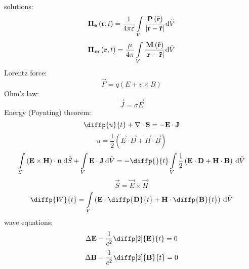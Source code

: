 solutions:
\begin{equation}
\mathbf{\Pi_e}\left(\mathbf{r}, t \right) = \frac{1}{4 \pi \varepsilon} \int\limits_{V} \frac{\mathbf{P}\left(\mathbf{\tilde{r}} \right)}{\lvert\mathbf{r} - \mathbf{\tilde{r}}\rvert} \mathrm{d} \tilde{V}
\end{equation}
\begin{equation}
\mathbf{\Pi_m}\left(\mathbf{r}, t \right) = \frac{\mu}{4 \pi} \int\limits_{V} \frac{\mathbf{M}\left(\mathbf{\tilde{r}} \right)}{\lvert\mathbf{r} - \mathbf{\tilde{r}}\rvert} \mathrm{d} \tilde{V}
\end{equation}
Lorentz force:
\begin{equation}
\vec{F} = q \left(E + v \times B \right) 
\end{equation}
Ohm's law:
\begin{equation}
\vec{J} = \sigma \vec{E}
\end{equation}
Energy (Poynting) theorem:
\begin{equation}
\diffp{u}{t} + \div{\vec{S}} = - \vec{E} \cdot \vec{J}
\end{equation}
\begin{equation}
u = \frac{1}{2} \left(\vec{E} \cdot \vec{D} + \vec{H} \cdot \vec{B} \right)
\end{equation}
\begin{equation}
\int\limits_{S} \left(\vec{E} \times \vec{H} \right) \cdot \vec{n} \: \d \tilde{S} + \int\limits_{V} \vec{E} \cdot \vec{J} \: \d \tilde{V} = - \diffp{}{t} \int\limits_{V} \frac{1}{2} \left(\vec{E} \cdot \vec{D} + \vec{H} \cdot \vec{B} \right) \: \d \tilde{V}
\end{equation}
\begin{equation}
\vec{S} = \vec{E} \times \vec{H}
\end{equation}
\begin{equation}
\diffp{W}{t} = \int\limits_{V} \left(\vec{E} \cdot \diffp{\vec{D}}{t} + \vec{H} \cdot \diffp{\vec{B}}{t}\right) \: \d \tilde{V}
\end{equation}
wave equations:
\begin{equation}
\laplace{\vec{E}} - \frac{1}{c^{2}} \diffp[2]{\vec{E}}{t} = 0
\end{equation}
\begin{equation}
\laplace{\vec{B}} - \frac{1}{c^{2}} \diffp[2]{\vec{B}}{t} = 0
\end{equation}

